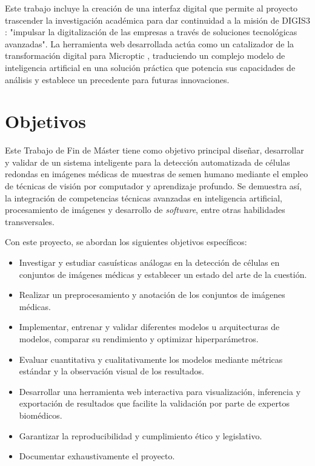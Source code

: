 \documentclass[12pt,a4paper,onecolumn,oneside]{report}
\begin{document}
Este trabajo incluye la creación de una interfaz digital que permite
al proyecto trascender la investigación académica para dar continuidad a la misión de DIGIS3 \cite{digis3}: "impulsar la digitalización de las empresas a través 
de soluciones tecnológicas avanzadas". La herramienta web desarrollada actúa como un catalizador de la transformación digital para Microptic \cite{microptic}, traduciendo 
un complejo modelo de inteligencia artificial en una solución práctica que potencia sus capacidades de análisis y establece un precedente para futuras innovaciones.

\section{Objetivos}
\label{sec:Objetivos}

Este Trabajo de Fin de Máster tiene como objetivo principal diseñar, desarrollar y validar de un sistema inteligente para la detección automatizada de células redondas en imágenes médicas de muestras de semen humano
mediante el empleo de técnicas de visión por computador y aprendizaje profundo. 
Se demuestra así, la integración de competencias técnicas avanzadas en inteligencia artificial, procesamiento de imágenes y desarrollo de \textit{software}, entre otras habilidades transversales. 

Con este proyecto, se abordan los siguientes objetivos específicos: 

\begin{itemize}
  \item Investigar y estudiar casuísticas análogas en la detección de células en conjuntos de imágenes médicas y establecer un estado del arte de la cuestión.
  \item Realizar un preprocesamiento y anotación de los conjuntos de imágenes médicas.
  \item Implementar, entrenar y validar diferentes modelos u arquitecturas de modelos, comparar su rendimiento y optimizar hiperparámetros.
  \item Evaluar cuantitativa y cualitativamente los modelos mediante métricas estándar y la observación visual de los resultados.
  \item Desarrollar una herramienta web interactiva para visualización, inferencia y exportación de resultados que facilite la validación por parte de expertos biomédicos.
  \item Garantizar la reproducibilidad y cumplimiento ético y legislativo.
  \item Documentar exhaustivamente el proyecto.
\end{itemize}
\end{document}
